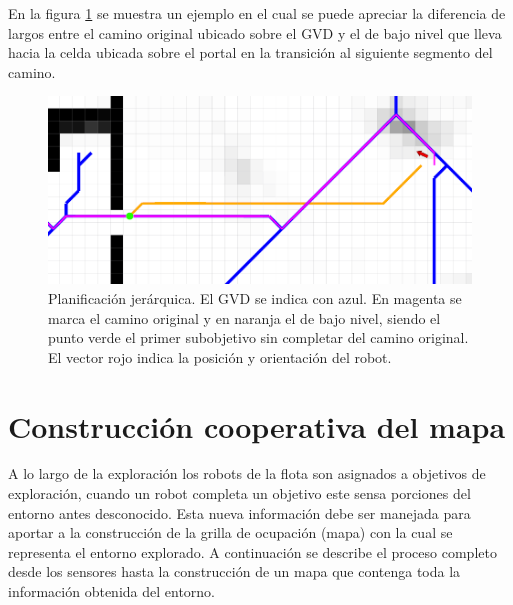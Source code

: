 En la figura \ref{fig:navjer} se muestra un ejemplo en el cual se puede
apreciar la diferencia de largos entre el camino original ubicado sobre
el GVD y el de bajo nivel que lleva hacia la celda ubicada sobre el
portal en la transición al siguiente segmento del camino.

\begin{figure}[H]
  \center
  \includegraphics[width=1\linewidth]{imagenes/navjer/caso1/a.png}
  \caption[Planificación jerárquica.]{Planificación jerárquica. El GVD
    se indica con azul. En magenta se marca el camino original y en
    naranja el de bajo nivel, siendo el punto verde el primer
    subobjetivo sin completar del camino original. El vector rojo indica
    la posición y orientación del robot.
 }
  \label{fig:navjer}
\end{figure} 


\section{Construcción cooperativa del mapa}



A lo largo de la exploración los robots de la flota son asignados a objetivos
de exploración, cuando un robot completa un objetivo este sensa porciones del
entorno antes desconocido. Esta nueva información debe ser manejada para
aportar a la construcción de la grilla de ocupación (mapa) con la cual se
representa el entorno explorado. A continuación se describe el proceso completo
desde los sensores hasta la construcción de un mapa que contenga toda la
información obtenida del entorno.

